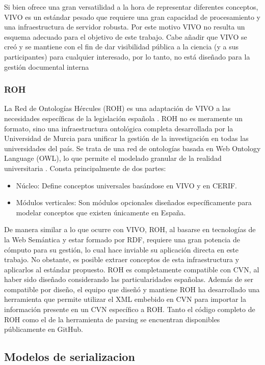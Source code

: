 \documentclass[12pt,a4paper]{article}
\begin{document}
Si bien ofrece una gran versatilidad a la hora de representar diferentes conceptos, VIVO es un estándar pesado que requiere una gran capacidad de procesamiento y una infraestructura de servidor robusta. Por este motivo VIVO no resulta un esquema adecuado para el objetivo de este trabajo. Cabe añadir que VIVO se creó y se mantiene con el fin de dar visibilidad pública a la ciencia (y a sus participantes) para cualquier interesado, por lo tanto, no está diseñado para la gestión documental interna

\subsubsection{ROH}

La Red de Ontologías Hércules (ROH) es una adaptación de VIVO a las necesidades específicas de la legislación española \cite{hercules_ontologias}. ROH no es meramente un formato, sino una infraestructura ontológica completa desarrollada por la Universidad de Murcia para unificar la gestión de la investigación en todas las universidades del país. Se trata de una red de ontologías basada en Web Ontology Language (OWL), lo que permite el modelado granular de la realidad universitaria \cite{roh_documentation}. Consta principalmente de dos partes:
\begin{itemize}
  \item Núcleo: Define conceptos universales basándose en VIVO y en CERIF.
  \item Módulos verticales: Son módulos opcionales diseñados específicamente para modelar conceptos que existen únicamente en España.
\end{itemize}
De manera similar a lo que ocurre con VIVO, ROH, al basarse en tecnologías de la Web Semántica y estar formado por RDF, requiere una gran potencia de cómputo para su gestión, lo cual hace inviable su aplicación directa en este trabajo. No obstante, es posible extraer conceptos de esta infraestructura y aplicarlos al estándar propuesto. ROH es completamente compatible con CVN, al haber sido diseñado considerando las particularidades españolas. Además de ser compatible por diseño, el equipo que diseñó y mantiene ROH ha desarrollado una herramienta que permite utilizar el XML embebido en CVN para importar la información presente en un CVN específico a ROH. Tanto el código completo de ROH \cite{roh_github} como el de la herramienta de parsing \cite{cvn_github} se encuentran disponibles públicamente en GitHub.

\subsection{Modelos de serializacion}
\end{document}
